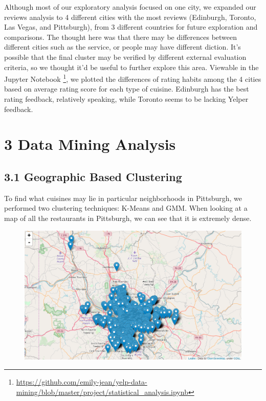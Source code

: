 \documentclass{neu_handout}
\begin{document}
Although most of our exploratory analysis focused on one city, we expanded our reviews analysis to 4 different cities with the most reviews (Edinburgh, Toronto, Las Vegas, and Pittsburgh), from 3 different countries for future exploration and comparisons. The thought here was that there may be differences between different cities such as the service, or people may have different diction. It's possible that the final cluster may be verified by different external evaluation criteria, so we thought it'd be useful to further explore this area. Viewable in the Jupyter Notebook \footnote{\url{https://github.com/emily-jean/yelp-data-mining/blob/master/project/statistical_analysis.ipynb}}, we plotted the differences of rating habits among the 4 cities based on average rating score for each type of cuisine. Edinburgh has the best rating feedback, relatively speaking, while Toronto seems to be lacking Yelper feedback.


\section*{3 Data Mining Analysis}

\subsection*{3.1 Geographic Based Clustering}
To find what cuisines may lie in particular neighborhoods in Pittsburgh, we performed two clustering techniques: K-Means and GMM. When looking at a map of all the restaurants in Pittsburgh, we can see that it is extremely dense.

\begin{figure}[h]
\centering
{
\includegraphics[width=0.4\linewidth]{all_restaurants_pitts}
}
\end{figure}
\end{document}
